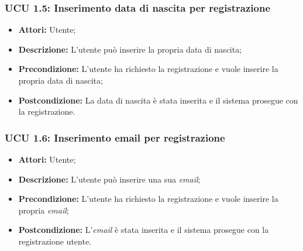 \hypertarget{U1.5}{}
\subsubsection{UCU 1.5: Inserimento data di nascita per registrazione}
\begin{itemize}
	\item \textbf{Attori:} Utente;
	\item \textbf{Descrizione:} L'utente può inserire la propria data di nascita;
	\item \textbf{Precondizione:} L'utente ha richiesto la registrazione e vuole inserire la propria data di nascita;
	\item \textbf{Postcondizione:} La data di nascita è stata inserita e il sistema prosegue con la registrazione.
\end{itemize}

\hypertarget{U1.6}{}
\subsubsection{UCU 1.6: Inserimento email per registrazione}
\begin{itemize}
	\item \textbf{Attori:} Utente;
	\item \textbf{Descrizione:} L'utente può inserire una sua \textit{email};
	\item \textbf{Precondizione:} L'utente ha richiesto la registrazione e vuole inserire la propria \textit{email};
\item \textbf{Postcondizione:} L'\textit{email} è stata inserita e il sistema prosegue con la registrazione utente.
\end{itemize}

\hypertarget{U2}{}

